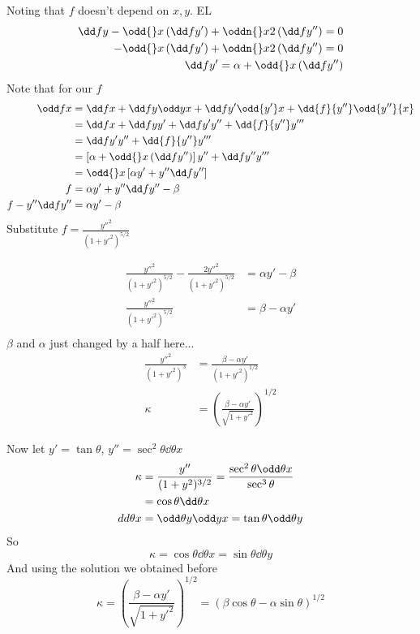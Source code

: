 \documentclass{E:/Documents/Latex/myassignment}
\begin{document}
Noting that $f$ doesn't depend on $x,y$.
EL
\begin{align*}
	\dd fy - \odd{}x \left(\dd fy'\right) + \oddn{}x2 \left(\dd f{y''}\right) = 0\\
	- \odd{}x \left(\dd fy'\right) + \oddn{}x2 \left(\dd f{y''}\right) = 0\\
	\dd fy'  = \alpha + \odd{}x \left(\dd f{y''}\right)\\
\end{align*}
Note that for our $f$
\begin{align*}
	\odd fx &= \dd fx + \dd fy \odd yx + \dd f{y'} \odd {y'}x + \dd{f}{y''} \odd{y''}{x}\\
	&= \dd fx + \dd fy y' + \dd f{y'} y'' + \dd{f}{y''} y'''\\
	&= \dd f{y'} y'' + \dd{f}{y''} y'''\\
	&= \left[\alpha + \odd{}x \left(\dd f{y''}\right)\right] y'' + \dd f{y''} y'''\\
	&= \odd{}x \left[\alpha y' + y'' \dd f{y''}\right]\\
	f &= \alpha y' + y'' \dd f{y''} - \beta\\
	f - y'' \dd f{y''} &= \alpha y' - \beta
\end{align*}
Substitute $f = \frac{y''^2}{(1+y'^2)^{5/2}}$

\begin{align*}
	\frac{y''^2}{(1+y'^2)^{5/2}} - \frac{2 y''^2}{(1+y'^2)^{5/2}} &= \alpha y' - \beta\\
	 \frac{y''^2}{(1+y'^2)^{5/2}} &= \beta - \alpha y'\\
\end{align*}
$\beta$ and $\alpha$ just changed by a half here...
\begin{align*}
	\frac{y''^2}{(1+y'^2)^{3}} &= \frac{\beta - \alpha y'}{(1+y'^2)^{1/2}}\\
	\kappa &= \left(\frac{\beta - \alpha y'}{\sqrt{1+y'^2}}\right)^{1/2}
\end{align*}

Now let $y' = \tan\theta$, $y'' = \sec^2\theta \dd \theta x$
\begin{align*}
	\kappa &= \frac{y''}{(1+y^2)^{3/2}} = \frac{\sec^2\theta \odd \theta x}{\sec^3\theta}\\
	&= \cos\theta \dd\theta x\\
	dd\theta x &= \odd \theta y \odd yx = \tan\theta \odd\theta y
\end{align*}
So
\[\kappa = \cos\theta \dd\theta x = \sin\theta \dd\theta y\]
And using the solution we obtained before
\[\kappa = \left(\frac{\beta - \alpha y'}{\sqrt{1+y'^2}}\right)^{1/2} = (\beta \cos\theta - \alpha \sin \theta)^{1/2}\]
\end{document}
